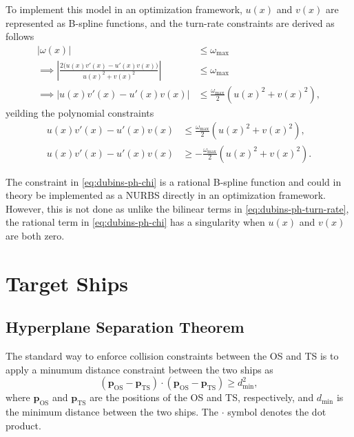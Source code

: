 To implement this model in an optimization framework, $u(x)$ and $v(x)$ are represented as B-spline functions, and the turn-rate constraints are derived as follows
\begin{equation*}
    \begin{aligned}
        |\omega(x)| &\le \omega_{\max} \\
        \implies \left|\frac{2\big(u(x)v'(x) - u'(x)v(x)\big)}{u(x)^2 + v(x)^2}\right| &\le \omega_{\max} \\
        \implies \left|u(x)v'(x) - u'(x)v(x)\right| &\le \frac{\omega_{\max}}{2}\left(u(x)^2 + v(x)^2\right),
    \end{aligned}
\end{equation*}
yeilding the polynomial constraints
\begin{subequations}\label{eq:dubins-ph-turn-rate}
    \begin{align}
        u(x)v'(x) - u'(x)v(x) &\le \frac{\omega_{\max}}{2}\left(u(x)^2 + v(x)^2\right), \\
        u(x)v'(x) - u'(x)v(x) &\ge -\frac{\omega_{\max}}{2}\left(u(x)^2 + v(x)^2\right).
    \end{align}
\end{subequations}

The constraint in \cref{eq:dubins-ph-chi} is a rational B-spline function and could in theory be implemented as a NURBS directly in an optimization framework. However, this is not done as unlike the bilinear terms in \cref{eq:dubins-ph-turn-rate}, the rational term in \cref{eq:dubins-ph-chi} has a singularity when $u(x)$ and $v(x)$ are both zero.


\section{Target Ships}

\subsection{Hyperplane Separation Theorem}
The standard way to enforce collision constraints between the OS and TS is to apply a minumum distance constraint between the two ships as
\begin{equation}\label{eq:minimum-distance}
    (\mathbf p_{\text{OS}} - \mathbf p_{\text{TS}}) \cdot (\mathbf p_{\text{OS}} - \mathbf p_{\text{TS}}) \geq d_{\text{min}}^2,
\end{equation}
where $\mathbf p_{\text{OS}}$ and $\mathbf p_{\text{TS}}$ are the positions of the OS and TS, respectively, and $d_{\text{min}}$ is the minimum distance between the two ships. The $\cdot$ symbol denotes the dot product. 

